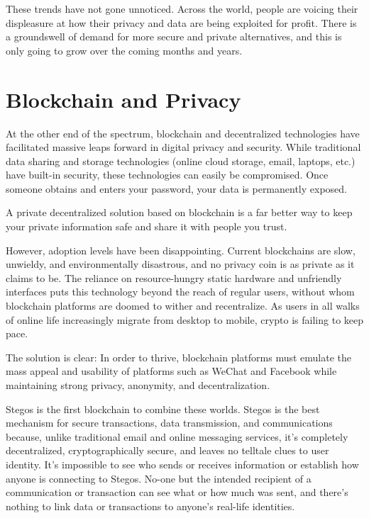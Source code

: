 \documentclass[8pt,fleqn,openany]{book}
\begin{document}
	These trends have not gone unnoticed. Across the world, people are voicing their displeasure at how their privacy and data are being exploited for profit. There is a groundswell of demand for more secure and private alternatives, and this is only going to grow over the coming months and years.
	
	\section{Blockchain and Privacy}
	At the other end of the spectrum, blockchain and decentralized technologies have facilitated massive leaps forward in digital privacy and security. While traditional data sharing and storage technologies (online cloud storage, email, laptops, etc.) have built-in security, these technologies can easily be compromised. Once someone obtains and enters your password, your data is permanently exposed.
	
	A private decentralized solution based on blockchain is a far better way to keep your private information safe and share it with people you trust.
	
	However, adoption levels have been disappointing. Current blockchains are slow, unwieldy, and environmentally disastrous, and no privacy coin is as private as it claims to be. The reliance on resource-hungry static hardware and unfriendly interfaces puts this technology beyond the reach of regular users, without whom blockchain platforms are doomed to wither and recentralize. As users in all walks of online life increasingly migrate from desktop to mobile, crypto is failing to keep pace. 
	
	The solution is clear: In order to thrive, blockchain platforms must emulate the mass appeal and usability of platforms such as WeChat and Facebook while maintaining strong privacy, anonymity, and decentralization.
	
	Stegos is the first blockchain to combine these worlds. Stegos is the best mechanism for secure transactions, data transmission, and communications because, unlike traditional email and online messaging services, it’s completely decentralized, cryptographically secure, and leaves no telltale clues to user identity. It’s impossible to see who sends or receives information or establish how anyone is connecting to Stegos. No-one but the intended recipient of a communication or transaction can see what or how much was sent, and there’s nothing to link data or transactions to anyone’s real-life identities.
	
\end{document}
